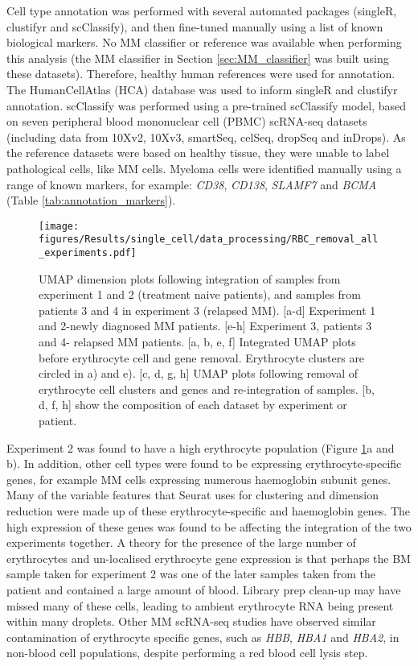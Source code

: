 Cell type annotation was performed with several automated packages (singleR, clustifyr and scClassify), and then fine-tuned manually using a list of known biological markers.
No MM classifier or reference was available when performing this analysis (the MM classifier in Section \ref{sec:MM_classifier} was built using these datasets).
Therefore, healthy human references were used for annotation.
The HumanCellAtlas (HCA) database was used to inform singleR and clustifyr annotation.
scClassify was performed using a pre-trained scClassify model, based on seven peripheral blood mononuclear cell (PBMC) scRNA-seq datasets (including data from 10Xv2, 10Xv3, smartSeq, celSeq, dropSeq and inDrops).
As the reference datasets were based on healthy tissue, they were unable to label pathological cells, like MM cells.
Myeloma cells were identified manually using a range of known markers, for example: \textit{CD38}, \textit{CD138}, \textit{SLAMF7} and \textit{BCMA} (Table \ref{tab:annotation_markers}).

\begin{figure}[htb]
    \centering
    \texttt{[image: figures/Results/single\_cell/data\_processing/RBC\_removal\_all\_experiments.pdf]}
    \caption[Erythrocyte removal from scRNA-seq datasets]{UMAP dimension plots following integration of samples from experiment 1 and 2 (treatment naive patients), and samples from patients 3 and 4 in experiment 3 (relapsed MM).
    [a-d] Experiment 1 and 2-newly diagnosed MM patients.
    [e-h] Experiment 3, patients 3 and 4- relapsed MM patients.
     [a, b, e, f] Integrated UMAP plots before erythrocyte cell and gene removal. Erythrocyte clusters are circled in a) and e).
     [c, d, g, h] UMAP plots following removal of erythrocyte cell clusters and genes and re-integration of samples.
     [b, d, f, h] show the composition of each dataset by experiment or patient.}
    \label{fig:umap_RBC}
\end{figure}

Experiment 2 was found to have a high erythrocyte population (Figure \ref{fig:umap_RBC}a and b).
In addition, other cell types were found to be expressing erythrocyte-specific genes, for example MM cells expressing numerous haemoglobin subunit genes.
Many of the variable features that Seurat uses for clustering and dimension reduction were made up of these erythrocyte-specific and haemoglobin genes.
The high expression of these genes was found to be affecting the integration of the two experiments together.
A theory for the presence of the large number of erythrocytes and un-localised erythrocyte gene expression is that perhaps the BM sample taken for experiment 2 was one of the later samples taken from the patient and contained a large amount of blood.
Library prep clean-up may have missed many of these cells, leading to ambient erythrocyte RNA being present within many droplets.
Other MM scRNA-seq studies have observed similar contamination of erythrocyte specific genes, such as \textit{HBB}, \textit{HBA1} and \textit{HBA2}, in non-blood cell populations, despite performing a red blood cell lysis step\cite{chen2021cryopreservation}.

